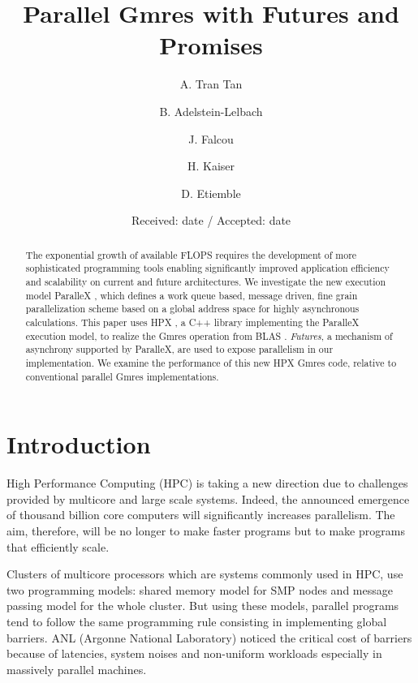 \documentclass[smallextended]{svjour3}
\begin{document}
\title{Parallel Gmres with Futures and Promises}

\author{A. Tran Tan \and B. Adelstein-Lelbach \and \newline J. Falcou \and H. Kaiser \and D. Etiemble }
\date{Received: date / Accepted: date}

\maketitle

\begin{abstract}
The exponential growth of available FLOPS requires the development of more sophisticated programming tools enabling significantly improved 
application efficiency and scalability on current and future architectures. We investigate the new execution model ParalleX \cite{ParalleX}, which defines a work queue based, message driven, fine grain parallelization scheme based on a global address space for highly asynchronous calculations. This paper uses HPX \cite{ParalleX}, a C++ library implementing the ParalleX execution model, to realize the Gmres operation from BLAS \cite{GMRES}. \emph{Futures}, a mechanism of asynchrony \cite{Futures1} \cite{Futures2} supported by ParalleX, are used to expose parallelism in our implementation. We examine the performance of this new HPX Gmres code, relative to conventional parallel Gmres implementations. 
\end{abstract}


\section{Introduction}\label{Introduction}
High Performance Computing (HPC) is taking a new direction due to challenges provided by multicore and large scale systems. Indeed, the announced emergence of thousand billion core computers will significantly increases parallelism. The aim, therefore, will be no longer to make faster programs but to make programs that efficiently scale.\smallskip 

Clusters of multicore processors which are systems commonly used in HPC, use two programming models: shared memory model for SMP nodes and message passing model for the whole cluster. But using these models, parallel programs tend to follow the same programming rule consisting in implementing global barriers. ANL (Argonne National Laboratory) noticed the critical cost of barriers because
of latencies, system noises and non-uniform workloads especially in massively parallel machines. \cite{Barrier}\smallskip 
\end{document}
